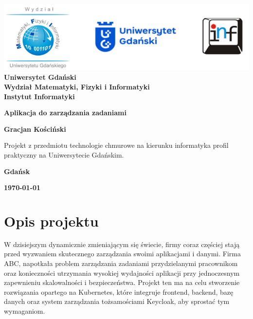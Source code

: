 \documentclass[12pt,a4paper]{article}
\newcommand{\hmwkTitle}{Aplikacja do zarządzania zadaniami} %
\newcommand{\hmwkDueDate}{\today} %
\newcommand{\hmwkAuthorName}{Gracjan Kościński} %
\begin{document}
\begin{titlepage}
    \vfill
	\begin{center}
	\hspace*{-1cm}
	\vspace*{0.5cm}
    \includegraphics[scale=0.55]{imagens/loga.png}\\
	\textbf{Uniwersytet Gdański \\ [0.05cm]Wydział Matematyki, Fizyki i Informatyki \\ [0.05cm] Instytut Informatyki}

	\vspace{0.6cm}
	\vspace{4cm}
	{\huge \textbf{\hmwkTitle}}\vspace{8mm}
	
	{\large \textbf{\hmwkAuthorName}}\\[3cm]
	
		\hspace{.45\textwidth} %
	   \begin{minipage}{.5\textwidth}
	   Projekt z przedmiotu technologie chmurowe na kierunku informatyka profil praktyczny na Uniwersytecie Gdańskim.\\[0.1cm]
	  \end{minipage}
	  \vfill
	
	\textbf{Gdańsk}
	
	\textbf{\hmwkDueDate}
	\end{center}
	
\end{titlepage}

\newpage
\setcounter{secnumdepth}{5}
\tableofcontents
\newpage

\section{Opis projektu}
\label{sec:Project}
W dzisiejszym dynamicznie zmieniającym się świecie, firmy coraz częściej stają przed wyzwaniem skutecznego zarządzania swoimi aplikacjami i danymi. Firma ABC, napotkała problem zarządzania zadaniami przydzielanymi pracownikom oraz konieczności utrzymania wysokiej wydajności aplikacji przy jednoczesnym zapewnieniu skalowalności i bezpieczeństwa. Projekt ten ma na celu stworzenie rozwiązania opartego na Kubernetes, które integruje frontend, backend, bazę danych oraz system zarządzania tożsamościami Keycloak, aby sprostać tym wymaganiom.
\end{document}

